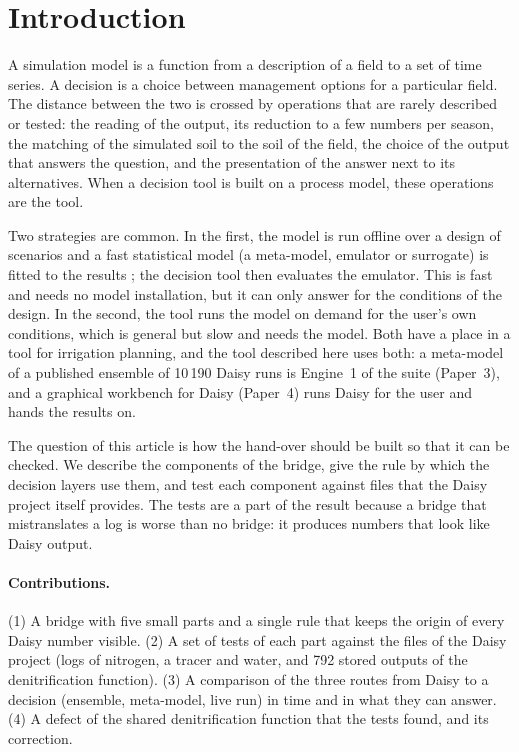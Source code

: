 \section{Introduction}
A simulation model is a function from a description of a field to a set of time series. A decision is a choice between management options for a particular field. The distance between the two is crossed by operations that are rarely described or tested: the reading of the output, its reduction to a few numbers per season, the matching of the simulated soil to the soil of the field, the choice of the output that answers the question, and the presentation of the answer next to its alternatives. When a decision tool is built on a process model, these operations are the tool.

Two strategies are common. In the first, the model is run offline over a design of scenarios and a fast statistical model (a meta-model, emulator or surrogate) is fitted to the results \citep{Sacks1989,Kennedy2001,Razavi2012}; the decision tool then evaluates the emulator. This is fast and needs no model installation, but it can only answer for the conditions of the design. In the second, the tool runs the model on demand for the user's own conditions, which is general but slow and needs the model. Both have a place in a tool for irrigation planning, and the tool described here uses both: a meta-model of a published ensemble of 10\,190 Daisy runs \citep{HaliluData} is Engine~1 of the suite (Paper~3), and a graphical workbench for Daisy (Paper~4) runs Daisy for the user and hands the results on.

The question of this article is how the hand-over should be built so that it can be checked. We describe the components of the bridge, give the rule by which the decision layers use them, and test each component against files that the Daisy project itself provides. The tests are a part of the result because a bridge that mistranslates a log is worse than no bridge: it produces numbers that look like Daisy output.

\paragraph{Contributions.} (1) A bridge with five small parts and a single rule that keeps the origin of every Daisy number visible. (2) A set of tests of each part against the files of the Daisy project (logs of nitrogen, a tracer and water, and 792 stored outputs of the denitrification function). (3) A comparison of the three routes from Daisy to a decision (ensemble, meta-model, live run) in time and in what they can answer. (4) A defect of the shared denitrification function that the tests found, and its correction.

